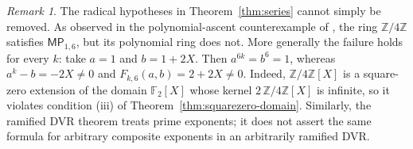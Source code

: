 \documentclass[11pt,a4paper]{amsart}
\theoremstyle{definition}
\theoremstyle{remark}
\newtheorem{remark}[theorem]{Remark}
\newcommand{\MP}[2]{\mathsf{MP}_{#1,#2}}
\numberwithin{equation}{section}
\begin{document}
\begin{remark}\label{rem:scope}
The radical hypotheses in Theorem~\ref{thm:series} cannot simply be
removed. As observed in the polynomial-ascent counterexample of \cite{TS}, the ring
$\mathbb Z/4\mathbb Z$ satisfies $\MP{1}{6}$, but its polynomial ring
does not. More generally the failure holds for every $k$: take $a=1$
and $b=1+2X$. Then $a^{6k}=b^6=1$, whereas
$a^k-b=-2X\ne0$ and $F_{k,6}(a,b)=2+2X\ne0$.
Indeed, $\mathbb Z/4\mathbb Z[X]$ is a square-zero extension of the
domain $\mathbb F_2[X]$ whose kernel $2\,\mathbb Z/4\mathbb Z[X]$ is infinite,
so it violates condition (iii) of Theorem~\ref{thm:squarezero-domain}. Similarly, the ramified DVR theorem treats
prime exponents; it does not assert the same formula for arbitrary
composite exponents in an arbitrarily ramified DVR.
\end{remark}
\end{document}
